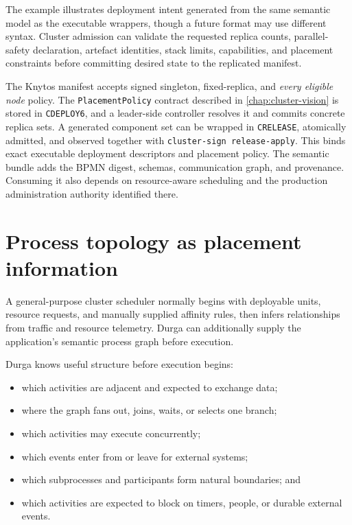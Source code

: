 The example illustrates deployment intent generated from the same semantic
model as the executable wrappers, though a future format may use different syntax.
Cluster admission can validate the requested replica counts,
parallel-safety declaration, artefact identities, stack limits, capabilities,
and placement constraints before committing desired state to the replicated
manifest.

The Knytos manifest accepts signed singleton, fixed-replica, and
\emph{every eligible node} policy. The \texttt{PlacementPolicy} contract
described in \autoref{chap:cluster-vision} is stored in \texttt{CDEPLOY6}, and a
leader-side controller resolves it and commits concrete replica sets. A
generated component set can be wrapped in \texttt{CRELEASE}, atomically
admitted, and observed together with \texttt{cluster-sign release-apply}.
This binds exact executable deployment descriptors and placement policy. The
semantic bundle adds the BPMN digest, schemas, communication graph, and
provenance. Consuming it also depends on resource-aware scheduling and the
production administration authority identified there.

\section{Process topology as placement information}

A general-purpose cluster scheduler normally begins with deployable units,
resource requests, and manually supplied affinity rules, then infers
relationships from traffic and resource telemetry. Durga can additionally
supply the application's semantic process graph before execution.

Durga knows useful structure before execution begins:

\begin{itemize}
    \item which activities are adjacent and expected to exchange data;
    \item where the graph fans out, joins, waits, or selects one branch;
    \item which activities may execute concurrently;
    \item which events enter from or leave for external systems;
    \item which subprocesses and participants form natural boundaries; and
    \item which activities are expected to block on timers, people, or durable
        external events.
\end{itemize}

